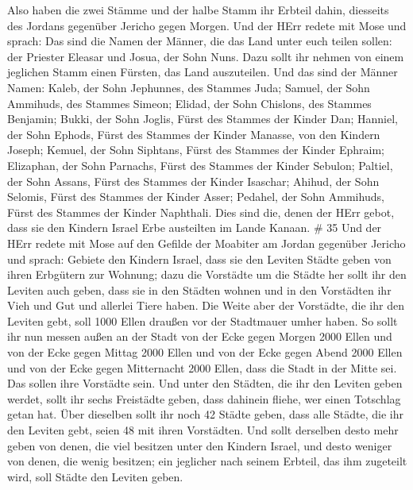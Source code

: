  Also haben die zwei Stämme und der halbe Stamm ihr Erbteil
dahin, diesseits des Jordans gegenüber Jericho gegen Morgen.
 Und der HErr redete mit Mose und sprach:  Das
sind die Namen der Männer, die das Land unter euch teilen sollen: der
Priester Eleasar und Josua, der Sohn Nuns.  Dazu sollt ihr
nehmen von einem jeglichen Stamm einen Fürsten, das Land auszuteilen.
 Und das sind der Männer Namen: Kaleb, der Sohn Jephunnes,
des Stammes Juda;  Samuel, der Sohn Ammihuds, des Stammes
Simeon;  Elidad, der Sohn Chislons, des Stammes Benjamin;
 Bukki, der Sohn Joglis, Fürst des Stammes der Kinder Dan;
 Hanniel, der Sohn Ephods, Fürst des Stammes der Kinder
Manasse, von den Kindern Joseph;  Kemuel, der Sohn
Siphtans, Fürst des Stammes der Kinder Ephraim;  Elizaphan,
der Sohn Parnachs, Fürst des Stammes der Kinder Sebulon; 
Paltiel, der Sohn Assans, Fürst des Stammes der Kinder Isaschar;
 Ahihud, der Sohn Selomis, Fürst des Stammes der Kinder
Asser;  Pedahel, der Sohn Ammihuds, Fürst des Stammes der
Kinder Naphthali.  Dies sind die, denen der HErr gebot,
dass sie den Kindern Israel Erbe austeilten im Lande Kanaan. \# 35
 Und der HErr redete mit Mose auf den Gefilde der Moabiter
am Jordan gegenüber Jericho und sprach:  Gebiete den Kindern
Israel, dass sie den Leviten Städte geben von ihren Erbgütern zur
Wohnung;  dazu die Vorstädte um die Städte her sollt ihr den
Leviten auch geben, dass sie in den Städten wohnen und in den Vorstädten
ihr Vieh und Gut und allerlei Tiere haben.  Die Weite aber
der Vorstädte, die ihr den Leviten gebt, soll 1000 Ellen draußen vor der
Stadtmauer umher haben.  So sollt ihr nun messen außen an
der Stadt von der Ecke gegen Morgen 2000 Ellen und von der Ecke gegen
Mittag 2000 Ellen und von der Ecke gegen Abend 2000 Ellen und von der
Ecke gegen Mitternacht 2000 Ellen, dass die Stadt in der Mitte sei. Das
sollen ihre Vorstädte sein.  Und unter den Städten, die ihr
den Leviten geben werdet, sollt ihr sechs Freistädte geben, dass
dahinein fliehe, wer einen Totschlag getan hat. Über dieselben sollt ihr
noch 42 Städte geben,  dass alle Städte, die ihr den Leviten
gebt, seien 48 mit ihren Vorstädten.  Und sollt derselben
desto mehr geben von denen, die viel besitzen unter den Kindern Israel,
und desto weniger von denen, die wenig besitzen; ein jeglicher nach
seinem Erbteil, das ihm zugeteilt wird, soll Städte den Leviten geben.
